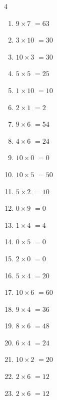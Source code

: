 \begin{multicols}{4}
\begin{enumerate}
  \item $9\times 7$
        $=63$

  \item $3\times 10$
        $=30$

  \item $10\times 3$
        $=30$

  \item $5\times 5$
        $=25$

  \item $1\times 10$
        $=10$

  \item $2\times 1$
        $=2$

  \item $9\times 6$
        $=54$

  \item $4\times 6$
        $=24$

  \item $10\times 0$
        $=0$

  \item $10\times 5$
        $=50$

  \item $5\times 2$
        $=10$

  \item $0\times 9$
        $=0$

  \item $1\times 4$
        $=4$

  \item $0\times 5$
        $=0$

  \item $2\times 0$
        $=0$

  \item $5\times 4$
        $=20$

  \item $10\times 6$
        $=60$

  \item $9\times 4$
        $=36$

\columnbreak %

  \item $8\times 6$
        $=48$

  \item $6\times 4$
        $=24$

  \item $10\times 2$
        $=20$

  \item $2\times 6$
        $=12$

  \item $2\times 6$
        $=12$


\end{enumerate}
\end{multicols}
